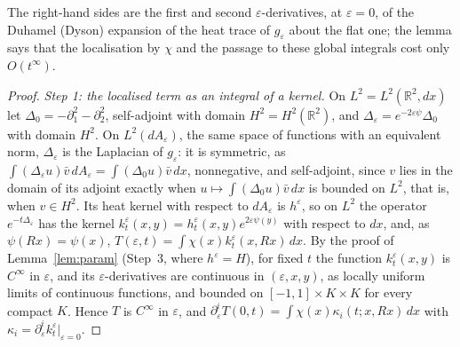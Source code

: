 \documentclass[pdflatex,sn-mathphys-num]{sn-jnl}
\theoremstyle{thmstyleone}%
\theoremstyle{thmstylethree}%
\newcommand{\R}{\mathbb{R}}
\begin{document}
\begin{appendices}
The right-hand sides are the first and second $\varepsilon$-derivatives, at $\varepsilon=0$, of the Duhamel (Dyson) expansion of the heat trace of $g_\varepsilon$ about the flat one; the lemma says that the localisation by $\chi$ and the passage to these global integrals cost only $O(t^\infty)$.

\begin{proof}
\emph{Step 1: the localised term as an integral of a kernel.} On $L^2=L^2(\R^2,dx)$ let $\Delta_0=-\partial_1^2-\partial_2^2$, self-adjoint with domain $H^2=H^2(\R^2)$, and $\Delta_\varepsilon=e^{-2\varepsilon\psi}\Delta_0$ with domain $H^2$. On $L^2(dA_\varepsilon)$, the same space of functions with an equivalent norm, $\Delta_\varepsilon$ is the Laplacian of $g_\varepsilon$: it is symmetric, as $\int(\Delta_\varepsilon u)\bar v\,dA_\varepsilon=\int(\Delta_0u)\bar v\,dx$, nonnegative, and self-adjoint, since $v$ lies in the domain of its adjoint exactly when $u\mapsto\int(\Delta_0u)\bar v\,dx$ is bounded on $L^2$, that is, when $v\in H^2$. Its heat kernel with respect to $dA_\varepsilon$ is $h^\varepsilon$, so on $L^2$ the operator $e^{-t\Delta_\varepsilon}$ has the kernel $k^\varepsilon_t(x,y)=h^\varepsilon_t(x,y)e^{2\varepsilon\psi(y)}$ with respect to $dx$, and, as $\psi(Rx)=\psi(x)$, $T(\varepsilon,t)=\int\chi(x)k^\varepsilon_t(x,Rx)\,dx$. By the proof of Lemma~\ref{lem:param} (Step~3, where $h^\varepsilon=H$), for fixed $t$ the function $k^\varepsilon_t(x,y)$ is $C^\infty$ in $\varepsilon$, and its $\varepsilon$-derivatives are continuous in $(\varepsilon,x,y)$, as locally uniform limits of continuous functions, and bounded on $[-1,1]\times K\times K$ for every compact $K$. Hence $T$ is $C^\infty$ in $\varepsilon$, and $\partial_\varepsilon^iT(0,t)=\int\chi(x)\kappa_i(t;x,Rx)\,dx$ with $\kappa_i=\partial_\varepsilon^ik^\varepsilon_t|_{\varepsilon=0}$.


\end{proof}
\end{appendices}
\end{document}
